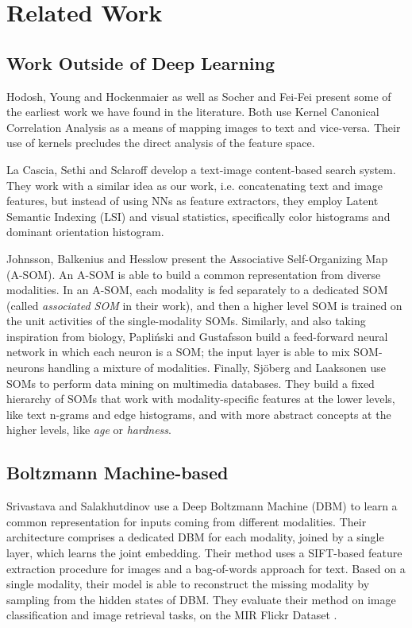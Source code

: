 \documentclass[a4paper]{standalone}
\begin{document}
\chapter{Related Work}\label{chap:relatedWork}
\section{Work Outside of Deep Learning}
Hodosh, Young and Hockenmaier \cite{hodosh2013framing} as well as Socher and Fei-Fei \cite{socher2010connecting} present some of the earliest work we have found in the literature. Both use Kernel Canonical Correlation Analysis as a means of mapping images to text and vice-versa. Their use of kernels precludes the direct analysis of the feature space.

La Cascia, Sethi and Sclaroff \cite{la1998combining} develop a text-image content-based search system. They work with a similar idea as our work, i.e. concatenating text and image features, but instead of using NNs as feature extractors, they employ Latent Semantic Indexing (LSI) and visual statistics, specifically color histograms and dominant orientation histogram.

Johnsson, Balkenius and Hesslow \cite{johnsson2011multimodal} present the Associative Self-Organizing Map (A-SOM). An A-SOM is able to build a common representation from diverse modalities. In an A-SOM, each modality is fed separately to a dedicated SOM (called \emph{associated SOM} in their work), and then a higher level SOM is trained on the unit activities of the single-modality SOMs. Similarly, and also taking inspiration from biology, Papliński and Gustafsson \cite{Paplinski2005} build a feed-forward neural network in which each neuron is a SOM; the input layer  is able to mix SOM-neurons handling a mixture of modalities. Finally, Sjöberg and Laaksonen \cite{sjobergintegrated} use SOMs to perform data mining on multimedia databases. They build a fixed hierarchy of SOMs that work with modality-specific features at the lower levels, like text n-grams and edge histograms, and with more abstract concepts at the higher levels, like \emph{age} or \emph{hardness}.

\section{Boltzmann Machine-based}

Srivastava and Salakhutdinov \cite{srivastava2012multimodal} use a Deep Boltzmann Machine (DBM) to learn a common representation for inputs coming from different modalities. Their architecture comprises a dedicated DBM for each modality, joined by a single layer, which learns the joint embedding. Their method uses a SIFT-based feature extraction procedure for images and a bag-of-words approach for text. Based on a single modality, their model is able to reconstruct the missing modality by sampling from the hidden states of DBM. They evaluate their method on image classification and image retrieval tasks, on the MIR Flickr Dataset \cite{huiskes2008mir}.
\end{document}
